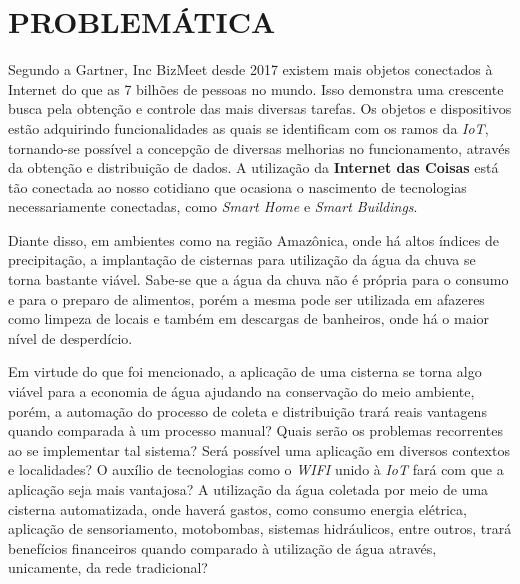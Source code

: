 
\chapter{PROBLEMÁTICA}
\label{chap:problematica}

Segundo a Gartner, Inc BizMeet \cite{BizMeet} desde 2017 existem mais objetos conectados à Internet do que as 7 bilhões de pessoas no mundo. Isso demonstra uma crescente busca pela obtenção e controle das mais diversas tarefas. Os objetos e dispositivos estão adquirindo funcionalidades as quais se identificam com os ramos da \textit{IoT}, tornando-se possível a concepção de diversas melhorias no funcionamento, através da obtenção e distribuição de dados.  A utilização da \textbf{Internet das Coisas} está tão conectada ao nosso cotidiano que ocasiona o nascimento de tecnologias necessariamente conectadas, como \textit{Smart Home} e \textit{Smart Buildings}. 

Diante disso, em ambientes como na região Amazônica, onde há altos índices de precipitação, a implantação de cisternas para utilização da água da chuva se torna bastante viável. Sabe-se que a água da chuva não é própria para o consumo e para o preparo de alimentos, porém a mesma pode ser utilizada em afazeres como limpeza de locais e também em descargas de banheiros, onde há o maior nível de desperdício.

Em virtude do que foi mencionado,  a aplicação de uma cisterna se torna algo viável para a economia de água ajudando na conservação do meio ambiente, porém, a automação do processo de coleta e distribuição trará reais vantagens quando comparada à um processo manual? Quais serão os problemas recorrentes ao se implementar tal sistema?  Será possível uma aplicação em diversos contextos e localidades?  O auxílio de tecnologias como o \textit{WIFI} unido à \textit{IoT} fará com que a aplicação seja mais vantajosa?  A utilização da água coletada por meio de uma cisterna automatizada, onde haverá gastos, como consumo energia elétrica, aplicação de sensoriamento, motobombas, sistemas hidráulicos, entre outros, trará benefícios financeiros quando comparado à utilização de água através, unicamente, da rede tradicional?
